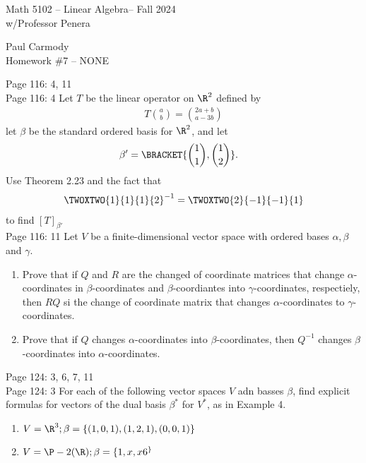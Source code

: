 \documentclass[10pt,a4paper]{report}
\newcommand{\CLASSNAME}{Math 5102 -- Linear Algebra}
\newcommand{\STUDENTNAME}{Paul Carmody}
\newcommand{\ASSIGNMENT}{Homework \#7 }
\newcommand{\DUEDATE}{NONE}
\newcommand{\SEMESTER}{Fall 2024}
\begin{document}
\begin{center}
	\Large{\CLASSNAME -- \SEMESTER} \\
	\large{ w/Professor Penera}
\end{center}
\begin{center}
	\STUDENTNAME \\
	\ASSIGNMENT -- \DUEDATE\\
\end{center} 

Page 116: 4, 11 \\

Page 116: 4 Let $T$ be the linear operator on $\R^2$ defined by 
\begin{align*}
	T\binom{a}{b}=\binom{2a+b}{a-3b}
\end{align*}let $\beta$ be the standard ordered basis for $\R^2$, and let
\begin{align*}
	\beta' &= \BRACKET{\binom{1}{1}, \binom{1}{2}}.
\end{align*}Use Theorem 2.23 and the fact that 
\begin{align*}
	\TWOXTWO{1}{1}{1}{2}^{-1}=\TWOXTWO{2}{-1}{-1}{1}
\end{align*}to find $[T]_{\beta'}$\\


Page 116: 11 Let $V$ be a finite-dimensional vector space with ordered bases $\alpha, \beta$ and $\gamma$.
	\begin{enumerate}[label=(\alph*)]
		\item Prove that if $Q$ and $R$ are the changed of coordinate matrices that change $\alpha$-coordinates in $\beta$-coordinates and $\beta$-coordiantes into $\gamma$-coordinates, respectiely, then $RQ$ si the change of coordinate matrix that changes $\alpha$-coordinates to $\gamma$-coordinates.
		\item Prove that if $Q$ changes $\alpha$-coordinates into $\beta$-coordinates, then $Q^{-1}$ changes $\beta$-coordinates into $\alpha$-coordinates.
	\end{enumerate} 

Page 124: 3, 6, 7, 11 \\

Page 124: 3 For each of the following vector spaces $V$ adn basses $\beta$, find explicit formulas for vectors of the dual basis $\beta^*$ for $V^*$, as in Example 4.
\begin{enumerate}[label=(\alph*)]
	\item $V = \R^3; \beta=\{(1,0,1),(1,2,1),(0,0,1)\}$
	\item $V=\P-2(\R); \beta=\{1,x,x6^\}$

\end{enumerate}
\end{document}
